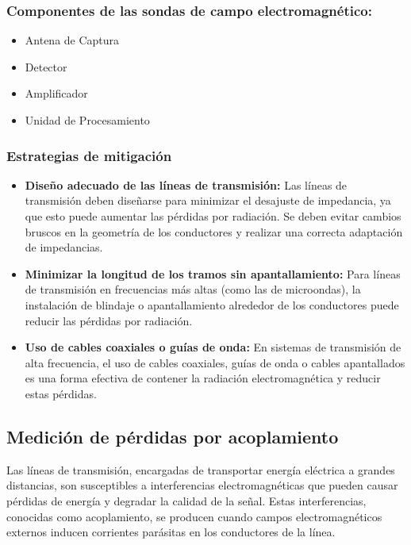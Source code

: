         \subsubsection*{Componentes de las sondas de campo electromagnético:}

            \begin{itemize}
              \item Antena de Captura
              \item Detector
              \item Amplificador
              \item Unidad de Procesamiento
            \end{itemize}

        \subsubsection{Estrategias de mitigación}

            \begin{itemize}
                \item \textbf{Diseño adecuado de las líneas de transmisión:}  Las líneas de transmisión deben diseñarse para minimizar el desajuste de impedancia, ya que esto puede aumentar las pérdidas por radiación. Se deben evitar cambios bruscos en la geometría de los conductores y realizar una correcta adaptación de impedancias.

                \item \textbf{Minimizar la longitud de los tramos sin apantallamiento: } Para líneas de transmisión en frecuencias más altas (como las de microondas), la instalación de blindaje o apantallamiento alrededor de los conductores puede reducir las pérdidas por radiación.

                \item \textbf{Uso de cables coaxiales o guías de onda:}   En sistemas de transmisión de alta frecuencia, el uso de cables coaxiales, guías de onda o cables apantallados es una forma efectiva de contener la radiación electromagnética y reducir estas pérdidas.
            \end{itemize}

    \subsection{Medición de pérdidas por acoplamiento}

        Las líneas de transmisión, encargadas de transportar energía eléctrica a grandes distancias, son susceptibles a interferencias electromagnéticas que pueden causar pérdidas de energía y degradar la calidad de la señal. Estas interferencias, conocidas como acoplamiento, se producen cuando campos electromagnéticos externos inducen corrientes parásitas en los conductores de la línea.
        
